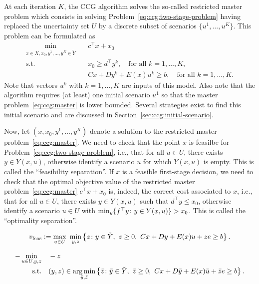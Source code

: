 At each iteration $K$, the CCG algorithm solves the so-called restricted
master problem which consists in solving
Problem~\eqref{eq:ccg:two-stage-problem} having replaced the uncertainty set
$U$ by a discrete subset of scenarios $\{ u^1, \dotsc, u^K \}$. This problem
can be formulated as  
\begin{subequations}
    \label{eq:ccg:master}
    \begin{align}
        \min_{x\in X, x_0, y^1, \dotsc, y^K\in\tilde{Y}} \quad & c^\top x + x_0 \\
        \text{s.t.} \quad & x_0 \ge d^\top y^k, \quad \text{for all } k=1,\dotsc,K, \\
        & Cx + Dy^k + E(x)u^k \ge b, \quad \text{for all } k=1,\dotsc,K.
    \end{align}
\end{subequations}
Note that vectors $u^k$ with $k=1,\dotsc,K$ are inputs of this model. Also
note that the algorithm requires (at least) one initial scenario $u^1$ so that
the master problem~\eqref{eq:ccg:master} is lower bounded. Several strategies
exist to find this initial scenario and are discussed in
Section~\ref{sec:ccg:initial-scenario}. 

Now, let $(x,x_0,y^1,\dotsc,y^K)$ denote a solution to the restricted master
problem~\eqref{eq:ccg:master}. We need to check that the point $x$ is feasilbe
for Problem~\eqref{eq:ccg:two-stage-problem}, i.e., that for all $u\in U$,
there exists $y\in Y(x,u)$, otherwise identify a scenario $u$ for which
$Y(x,u)$ is empty. This is called the ``feasibility separation''. If $x$ is a
feasible first-stage decision, we need to check that the optimal objective
value of the restricted master problem~\eqref{eq:ccg:master} $c^\top x + x_0$
is, indeed, the correct cost associated to $x$, i.e., that for all $u\in U$,
there exists $y\in Y(x,u)$ such that $d^\top y \le x_0$, otherwise identify a
scenario $u\in U$ with $\min_y\{ f^\top y \colon y\in Y(x,u) \} > x_0$. This
is called the ``optimality separation''. 

\begin{equation}
    v_\text{feas} \define \max_{u\in U} \ \min_{y,z} \Defset{ z }{
        y\in\tilde{Y}, \ z\ge 0, \ Cx + Dy + E(x)u + ze \ge b
    }.
\end{equation}

\begin{subequations}
    \begin{align*}
        - \min_{u\in U,y,z} \quad & -z \\
        \text{s.t.} \quad & (y,z) \in \operatorname*{arg\,min}_{\bar{y},\bar{z}} \left\{ \bar{z} \colon
            \bar{y}\in\tilde{Y}, \ \bar{z}\ge 0, \ Cx + D\bar{y} + E(x)\bar{u} + \bar{z}e \ge b
        \right\}.
    \end{align*}
\end{subequations}

